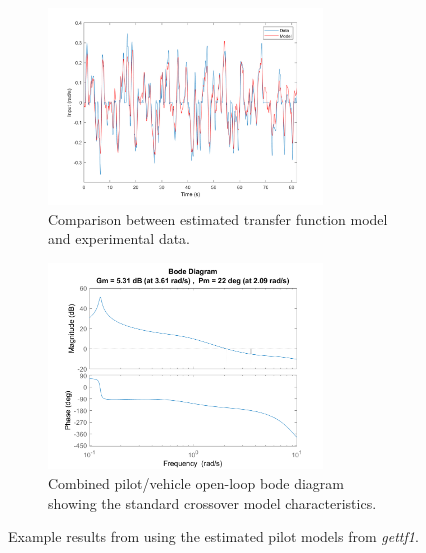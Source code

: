 \begin{figure}[t]
    \centering
    \begin{subfigure}[b]{\textwidth}
        \centering
        \includegraphics[width=0.8\textwidth]{figures/model_output.png}
        \caption[Comparison between estimated transfer function model and experimental data]{Comparison between estimated transfer function model and experimental data.}
        \label{fig:comparison}
    \end{subfigure}
    \hfill
    \begin{subfigure}[b]{\textwidth}
        \centering
        \includegraphics[width=0.8\textwidth]{figures/YpYc_204.png}
        \caption[Combined pilot/vehicle open-loop bode diagram]{Combined pilot/vehicle open-loop bode diagram showing the standard crossover model characteristics.}
        \label{fig:bode}
    \end{subfigure}
    \caption[Example results from using the estimated pilot models from \textit{gettf1}]{Example results from using the estimated pilot models from \textit{gettf1}.}
\end{figure}


